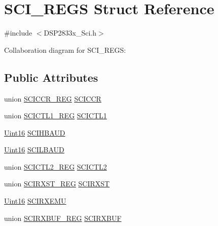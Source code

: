 \hypertarget{struct_s_c_i___r_e_g_s}{}\section{S\+C\+I\+\_\+\+R\+E\+G\+S Struct Reference}
\label{struct_s_c_i___r_e_g_s}


{\ttfamily \#include $<$D\+S\+P2833x\+\_\+\+Sci.\+h$>$}



Collaboration diagram for S\+C\+I\+\_\+\+R\+E\+G\+S\+:
\subsection*{Public Attributes}
\begin{DoxyCompactItemize}
\item 
union \hyperlink{union_s_c_i_c_c_r___r_e_g}{S\+C\+I\+C\+C\+R\+\_\+\+R\+E\+G} \hyperlink{struct_s_c_i___r_e_g_s_a04b57420d9dc62d4c35e3e2696ae3e69}{S\+C\+I\+C\+C\+R}
\item 
union \hyperlink{union_s_c_i_c_t_l1___r_e_g}{S\+C\+I\+C\+T\+L1\+\_\+\+R\+E\+G} \hyperlink{struct_s_c_i___r_e_g_s_a0508ccf2f96b6c037e871c468ce482a6}{S\+C\+I\+C\+T\+L1}
\item 
\hyperlink{_d_s_p2833x___device_8h_a59a9f6be4562c327cbfb4f7e8e18f08b}{Uint16} \hyperlink{struct_s_c_i___r_e_g_s_a52203d53359508a3bd26bdece3281269}{S\+C\+I\+H\+B\+A\+U\+D}
\item 
\hyperlink{_d_s_p2833x___device_8h_a59a9f6be4562c327cbfb4f7e8e18f08b}{Uint16} \hyperlink{struct_s_c_i___r_e_g_s_ad044f4e55fc52cd387a42ecc9fa6db60}{S\+C\+I\+L\+B\+A\+U\+D}
\item 
union \hyperlink{union_s_c_i_c_t_l2___r_e_g}{S\+C\+I\+C\+T\+L2\+\_\+\+R\+E\+G} \hyperlink{struct_s_c_i___r_e_g_s_a6f48ff2c3d3daa6ce0e9bb20f21c3511}{S\+C\+I\+C\+T\+L2}
\item 
union \hyperlink{union_s_c_i_r_x_s_t___r_e_g}{S\+C\+I\+R\+X\+S\+T\+\_\+\+R\+E\+G} \hyperlink{struct_s_c_i___r_e_g_s_a1e4af82f9810bbdfa98a24399167499f}{S\+C\+I\+R\+X\+S\+T}
\item 
\hyperlink{_d_s_p2833x___device_8h_a59a9f6be4562c327cbfb4f7e8e18f08b}{Uint16} \hyperlink{struct_s_c_i___r_e_g_s_ad9c5c8dd182d7a3899e4e496c709ebfc}{S\+C\+I\+R\+X\+E\+M\+U}
\item 
union \hyperlink{union_s_c_i_r_x_b_u_f___r_e_g}{S\+C\+I\+R\+X\+B\+U\+F\+\_\+\+R\+E\+G} \hyperlink{struct_s_c_i___r_e_g_s_a1a5ac923fd73b377afab87292089ed5d}{S\+C\+I\+R\+X\+B\+U\+F}
\item 

\end{DoxyCompactItemize}
